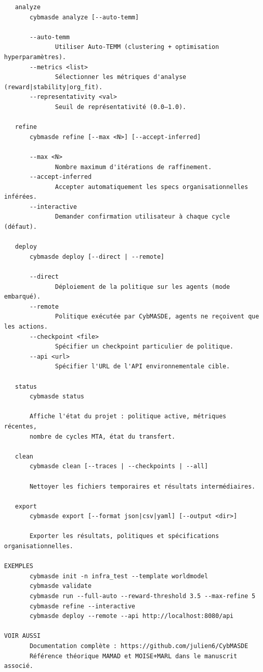 \begin{verbatim}
   analyze
       cybmasde analyze [--auto-temm]

       --auto-temm
              Utiliser Auto-TEMM (clustering + optimisation hyperparamètres).
       --metrics <list>
              Sélectionner les métriques d'analyse (reward|stability|org_fit).
       --representativity <val>
              Seuil de représentativité (0.0–1.0).

   refine
       cybmasde refine [--max <N>] [--accept-inferred]

       --max <N>
              Nombre maximum d'itérations de raffinement.
       --accept-inferred
              Accepter automatiquement les specs organisationnelles inférées.
       --interactive
              Demander confirmation utilisateur à chaque cycle (défaut).

   deploy
       cybmasde deploy [--direct | --remote]

       --direct
              Déploiement de la politique sur les agents (mode embarqué).
       --remote
              Politique exécutée par CybMASDE, agents ne reçoivent que les actions.
       --checkpoint <file>
              Spécifier un checkpoint particulier de politique.
       --api <url>
              Spécifier l'URL de l'API environnementale cible.

   status
       cybmasde status

       Affiche l'état du projet : politique active, métriques récentes,
       nombre de cycles MTA, état du transfert.

   clean
       cybmasde clean [--traces | --checkpoints | --all]

       Nettoyer les fichiers temporaires et résultats intermédiaires.

   export
       cybmasde export [--format json|csv|yaml] [--output <dir>]

       Exporter les résultats, politiques et spécifications organisationnelles.

EXEMPLES
       cybmasde init -n infra_test --template worldmodel
       cybmasde validate
       cybmasde run --full-auto --reward-threshold 3.5 --max-refine 5
       cybmasde refine --interactive
       cybmasde deploy --remote --api http://localhost:8080/api

VOIR AUSSI
       Documentation complète : https://github.com/julien6/CybMASDE
       Référence théorique MAMAD et MOISE+MARL dans le manuscrit associé.
\end{verbatim}
